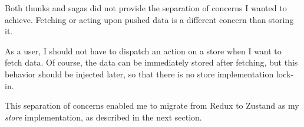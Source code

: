 Both thunks and sagas did not provide the separation of concerns
I wanted to achieve.
Fetching or acting upon pushed data
is a different concern than storing it.

As a user,
I should not have to dispatch an action on a store
when I want to fetch data.
Of course, the data can be immediately stored after fetching,
but this behavior should be injected later,
so that there is no store implementation lock-in.

This separation of concerns enabled me to
migrate from Redux to Zustand as my \textit{store} implementation,
as described in the next section.
